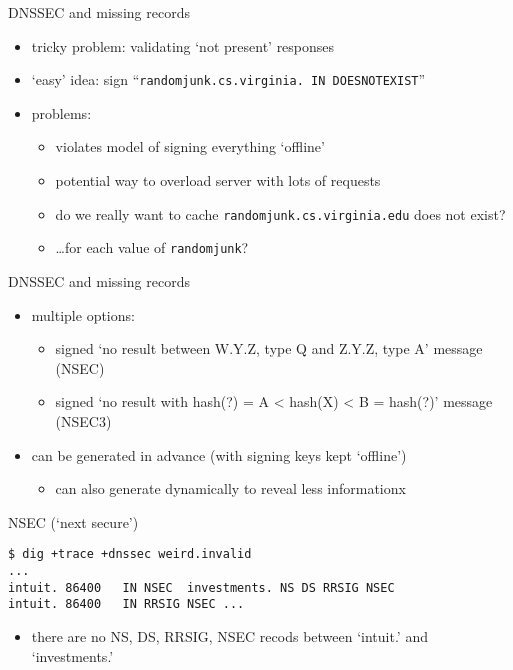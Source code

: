 
\begin{frame}{DNSSEC and missing records}
    \begin{itemize}
    \item tricky problem: validating `not present' responses
    \vspace{.5cm}
    \item `easy' idea: sign ``\texttt{randomjunk.cs.virginia. IN DOESNOTEXIST}''
    \item problems:
        \begin{itemize}
        \item violates model of signing everything `offline'
        \item potential way to overload server with lots of requests
        \item do we really want to cache \texttt{randomjunk.cs.virginia.edu} does not exist?
        \item \ldots for each value of \texttt{randomjunk}?
        \end{itemize}
    \end{itemize}
\end{frame}

\begin{frame}{DNSSEC and missing records}
    \begin{itemize}
    \item multiple options:
        \begin{itemize}
        \item signed `no result between W.Y.Z, type Q and Z.Y.Z, type A' message (NSEC)
        \item signed `no result with hash(?) = A < hash(X) < B = hash(?)' message (NSEC3)
        \end{itemize}
    \item can be generated in advance  (with signing keys kept `offline')
        \begin{itemize}
        \item can also generate dynamically to reveal less informationx
        \end{itemize}
    \end{itemize}
\end{frame}

\begin{frame}[fragile]{NSEC (`next secure')}
\begin{Verbatim}[fontsize=\fontsize{9}{10}]
$ dig +trace +dnssec weird.invalid
...
intuit. 86400   IN NSEC  investments. NS DS RRSIG NSEC
intuit. 86400   IN RRSIG NSEC ...
\end{Verbatim}
\begin{itemize}
\item there are no NS, DS, RRSIG, NSEC recods between `intuit.' and `investments.'
\end{itemize}
\end{frame}

